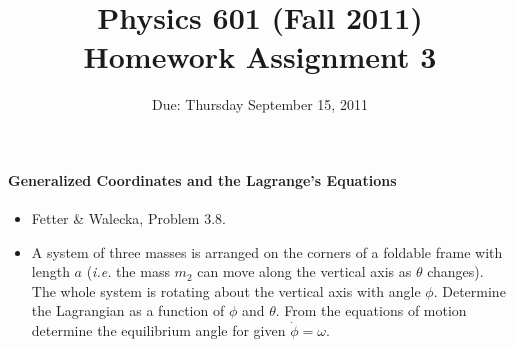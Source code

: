 \documentclass[letterpaper,11pt]{article}
\title{Physics 601 (Fall 2011) \\ Homework Assignment 3}
\date{Due: Thursday September 15, 2011}
\begin{document}
\maketitle

\paragraph*{Generalized Coordinates and the Lagrange's Equations}
\begin{itemize}
 \item Fetter \& Walecka, Problem 3.8.
 \item A system of three masses is arranged on the corners of a foldable frame with length $a$ (\textit{i.e.} the mass $m_2$ can move along the vertical axis as $\theta$ changes).  The whole system is rotating about the vertical axis with angle $\phi$.  Determine the Lagrangian as a function of $\phi$ and $\theta$.  From the equations of motion determine the equilibrium angle for given $\dot\phi = \omega$.
 \begin{center}
 \end{center}
\end{itemize}
\end{document}
